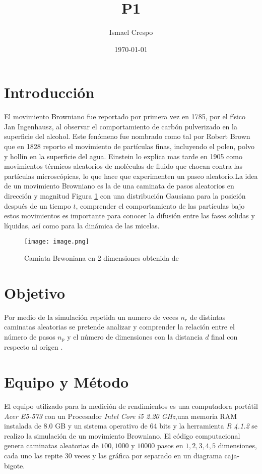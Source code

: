 \documentclass{article}
\title{P1}
\author{Ismael Crespo}
\date{\today}
\begin{document}
\maketitle

\section{Introducción}
El movimiento Browniano fue reportado por primera vez en 1785, por el físico Jan Ingenhausz, al observar el comportamiento de carbón pulverizado en la superficie del alcohol. Este fenómeno fue nombrado como tal por Robert Brown que en 1828 reporto el movimiento de partículas finas, incluyendo el polen, polvo y hollín en la superficie del agua. Einstein lo explica mas tarde en 1905 como movimientos térmicos aleatorios de moléculas de fluido que chocan contra las partículas microscópicas, lo que hace que experimenten un paseo aleatorio.La idea de un movimiento Browniano es la de una caminata de pasos aleatorios en dirección y magnitud Figura \ref{BM} con una distribución Gausiana para la posición después de un tiempo $t$, comprender el comportamiento de las partículas bajo estos movimientos es importante para conocer la difusión entre las fases solidas y líquidas, así como para la dinámica de las micelas\citep{K.Joseph_et_al_1996}.
\begin{figure}[h] %
    \centering
    \texttt{[image: image.png]} %
    \caption{Camiata Brwoniana en 2 dimensiones obtenida de \citep{K.Joseph_et_al_1996}}
    \label{BM}
\end{figure}
\section{Objetivo}
Por medio de la simulación repetida un numero de veces $n_r$ de distintas caminatas aleatorias se pretende analizar y comprender la relación entre el número de pasos $n_p$ y el número de dimensiones con la distancia $d$ final con respecto al origen .
\section{Equipo y Método}
El equipo utilizado para la medición de rendimientos es una computadora portátil \emph{Acer E5-573 } con un Procesador \emph{Intel Core i5 2.20 GHz},una memoria RAM instalada de 8.0 GB y un sistema operativo de 64 bits y la herramienta \emph{R 4.1.2} se realizo la simulación de un movimiento Browniano. El código computacional genera caminatas aleatorias de $100,1000$ y $10000$ pasos en $1,2,3,4,5$ dimensiones, cada uno las repite $30$ veces y las gráfica por separado en un diagrama caja-bigote. 
\end{document}
